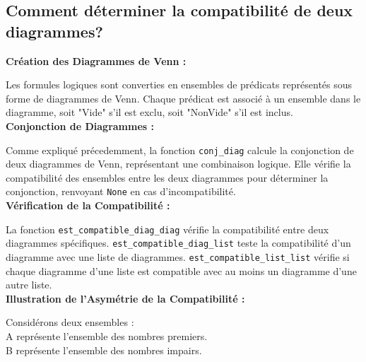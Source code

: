 \documentclass{article}
\begin{document}
\subsection{\textbf{Comment déterminer la compatibilité de deux diagrammes?}}


\textbf{Création des Diagrammes de Venn :}

Les formules logiques sont converties en ensembles de prédicats représentés sous forme de diagrammes de Venn. Chaque prédicat est associé à un ensemble dans le diagramme, soit "Vide" s'il est exclu, soit "NonVide" s'il est inclus.\\

\textbf{Conjonction de Diagrammes :}

Comme expliqué précedemment, la fonction \texttt{conj\_diag} calcule la conjonction de deux diagrammes de Venn, représentant une combinaison logique. Elle vérifie la compatibilité des ensembles entre les deux diagrammes pour déterminer la conjonction, renvoyant \texttt{None} en cas d'incompatibilité.\\

\textbf{Vérification de la Compatibilité :}

La fonction \texttt{est\_compatible\_diag\_diag} vérifie la compatibilité entre deux diagrammes spécifiques. \texttt{est\_compatible\_diag\_list} teste la compatibilité d'un diagramme avec une liste de diagrammes. \texttt{est\_compatible\_list\_list} vérifie si chaque diagramme d'une liste est compatible avec au moins un diagramme d'une autre liste.\\

\textbf{Illustration de l'Asymétrie de la Compatibilité :}

Considérons deux ensembles :\\
A représente l'ensemble des nombres premiers.\\
B représente l'ensemble des nombres impairs.
\end{document}
